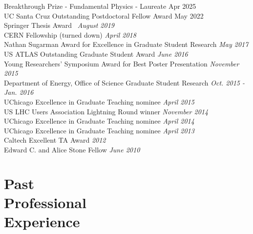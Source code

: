 \documentclass[margin,line]{resume}
\let\origsection\section%
\let\section\subsection%
\let\section\origsection%
\begin{document}
\begin{resume}
Breakthrough Prize - Fundamental Physics - Laureate \hfill{Apr 2025}\\
UC Santa Cruz Outstanding Postdoctoral Fellow Award \hfill{May 2022}\\
Springer Thesis Award~\cite{Stark2020} \hfill \textsl{August 2019}\\
CERN Fellowship (turned down) \hfill \textsl{April 2018}\\
Nathan Sugarman Award for Excellence in Graduate Student Research \hfill \textsl{May 2017}\\
US ATLAS Outstanding Graduate Student Award \hfill \textsl{June 2016}\\
Young Researchers' Symposium Award for Best Poster Presentation \hfill \textsl{November 2015}\\
Department of Energy, Office of Science Graduate Student Research \hfill \textsl{Oct. 2015 - Jan. 2016}\\
UChicago Excellence in Graduate Teaching nominee \hfill \textsl{April 2015}\\
US LHC Users Association Lightning Round winner \hfill \textsl{November 2014}\\
UChicago Excellence in Graduate Teaching nominee \hfill \textsl{April 2014}\\
UChicago Excellence in Graduate Teaching nominee \hfill \textsl{April 2013}\\
Caltech Excellent TA Award \hfill \textsl{2012}\\
Edward C. and Alice Stone Fellow \hfill \textsl{June 2010}


\section{\mysidestyle Past\\Professional\\Experience}


\end{resume}
\end{document}
